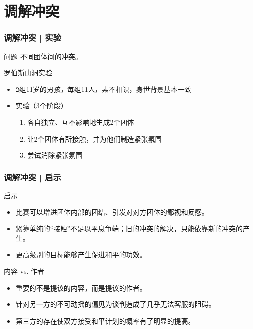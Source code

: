 \section{调解冲突}
\begin{frame}
  \frametitle{调解冲突 | 实验}
  \begin{block}{问题}
    不同团体间的冲突。
  \end{block}
  \pause
  \begin{block}{罗伯斯山洞实验}
    \begin{itemize}
      \item 2组11岁的男孩，每组11人，素不相识，身世背景基本一致
      \item 实验（3个阶段）
        \begin{enumerate}
          \item 各自独立、互不影响地生成2个团体
          \item 让2个团体有所接触，并为他们制造紧张氛围
          \item 尝试消除紧张氛围
        \end{enumerate}
    \end{itemize}
  \end{block}
\end{frame}

\begin{frame}
  \frametitle{调解冲突 | 启示}
  \begin{block}{启示}
    \begin{itemize}
      \item 比赛可以增进团体内部的团结、引发对对方团体的鄙视和反感。
      \item 紧靠单纯的“接触”不足以平息争端；旧的冲突的解决，只能依靠新的冲突的产生。
      \item 更高级别的目标能够产生促进和平的功效。
    \end{itemize}
  \end{block}
  \pause
  \begin{block}{内容 vs. 作者}
    \begin{itemize}
      \item 重要的不是提议的内容，而是提议的作者。
      \item 针对另一方的不可动摇的偏见为谈判造成了几乎无法客服的阻碍。
      \item 第三方的存在使双方接受和平计划的概率有了明显的提高。
    \end{itemize}
  \end{block}
\end{frame}

